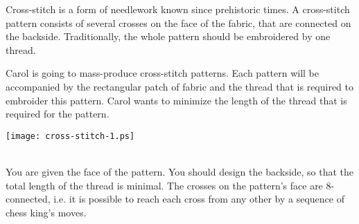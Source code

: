 Cross-stitch is a form of needlework known since prehistoric times. A cross-stitch pattern consists of several crosses on the face of the fabric, that are connected on the backside. Traditionally, the whole pattern should be embroidered by one thread.

Carol is going to mass-produce cross-stitch patterns. Each pattern will be accompanied by the rectangular patch of fabric and the thread that is required to embroider this pattern. Carol wants to minimize the length of the thread that is required for the pattern.\\
\centerline{\texttt{[image: cross-stitch-1.ps]}}\\
You are given the face of the pattern. You should design the backside, so that the total length of the thread is minimal. The crosses on the pattern's face are 8-connected, i.e. it is possible to reach each cross from any other by a sequence of chess king's moves.